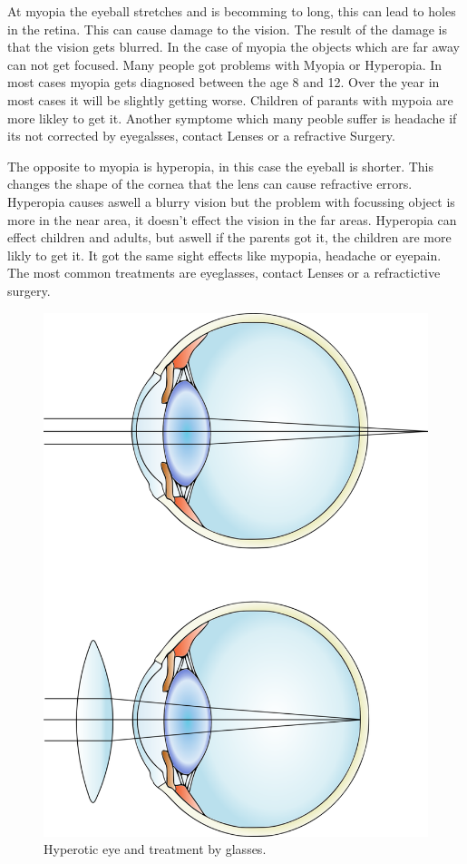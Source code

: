 \documentclass{sig-alternate-05-2015}
\begin{document}
At myopia the eyeball stretches and is becomming to long, this can lead to holes in the retina. This can cause damage to the vision. The result of the damage is that the vision gets blurred. In the case of myopia the objects which are far away can not get focused. Many people got problems with Myopia or Hyperopia. In most cases myopia gets diagnosed between the age 8 and 12. Over the year in most cases it will be slightly getting worse. Children of parants with mypoia are more likley to get it. Another symptome which many peoble suffer is headache if its not corrected by eyegalsses, contact Lenses or a refractive Surgery.

The opposite to myopia is hyperopia, in this case the eyeball is shorter. This changes the shape of the cornea that the lens can cause refractive errors. Hyperopia causes aswell a blurry vision but the problem with focussing object is more in the near area, it doesn't effect the vision in the far areas. Hyperopia can effect children and adults, but aswell if the parents got it, the children are more likly to get it. It got the same sight effects like mypopia, headache or eyepain. The most common treatments are eyeglasses, contact Lenses or a refractictive surgery. 

\begin{figure}
    \centering
    \includegraphics[width=0.75\columnwidth]{hyperopia.png}
    \caption{Hyperotic eye and treatment by glasses.}
    \label{fig:hyperopia}
\end{figure}
\end{document}
